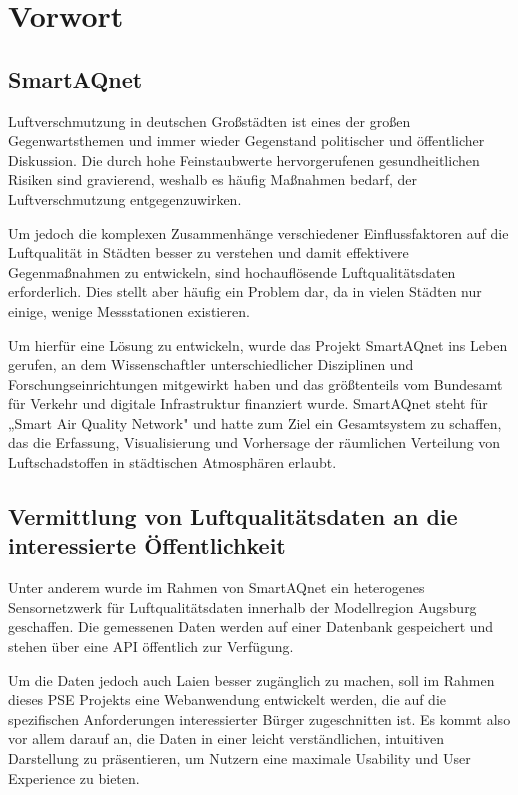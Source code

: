\section{Vorwort}

\subsection{SmartAQnet}
Luftverschmutzung in deutschen Großstädten ist eines der großen Gegenwartsthemen und immer wieder Gegenstand politischer und öffentlicher Diskussion. Die durch hohe Feinstaubwerte hervorgerufenen gesundheitlichen Risiken sind gravierend, weshalb es häufig Maßnahmen bedarf, der Luftverschmutzung entgegenzuwirken.

Um jedoch die komplexen Zusammenhänge verschiedener Einflussfaktoren auf die Luftqualität in Städten besser zu verstehen und damit effektivere Gegenmaßnahmen zu entwickeln, sind hochauflösende Luftqualitätsdaten erforderlich. Dies stellt aber häufig ein Problem dar, da in vielen Städten nur einige, wenige Messstationen existieren.

Um hierfür eine Lösung zu entwickeln, wurde das Projekt SmartAQnet ins Leben gerufen, an dem Wissenschaftler unterschiedlicher Disziplinen und Forschungseinrichtungen mitgewirkt haben und das größtenteils vom Bundesamt für Verkehr und digitale Infrastruktur finanziert wurde. SmartAQnet steht für „Smart Air Quality Network" und hatte zum Ziel ein Gesamtsystem zu schaffen, das die Erfassung, Visualisierung und Vorhersage der räumlichen Verteilung von Luftschadstoffen in städtischen Atmosphären erlaubt.

\subsection{Vermittlung von Luftqualitätsdaten an die interessierte Öffentlichkeit}

Unter anderem wurde im Rahmen von SmartAQnet ein heterogenes Sensornetzwerk für Luftqualitätsdaten innerhalb der Modellregion Augsburg geschaffen. Die gemessenen Daten werden auf einer Datenbank gespeichert und stehen über eine API öffentlich zur Verfügung.

Um die Daten jedoch auch Laien besser zugänglich zu machen, soll im Rahmen dieses PSE Projekts eine Webanwendung entwickelt werden, die auf die spezifischen Anforderungen interessierter Bürger zugeschnitten ist. Es kommt also vor allem darauf an, die Daten in einer leicht verständlichen, intuitiven Darstellung zu präsentieren, um Nutzern eine maximale Usability und User Experience zu bieten.